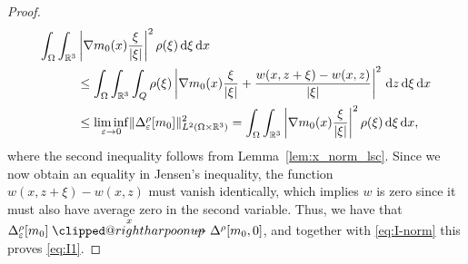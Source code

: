 \documentclass[reqno,11pt]{amsart}
\makeatletter
\numberwithin{equation}{section}
\theoremstyle{thmlemcorr}
\numberwithin{theorem}{section}
\theoremstyle{thmlemcorr*}
\theoremstyle{defi}
\theoremstyle{remexample}
\theoremstyle{ass}
\newcommand{\R}{\mathbb{R}}
\renewcommand{\epsilon}{\varepsilon}
\DeclarePairedDelimiter{\abs}{\lvert}{\rvert}
\DeclarePairedDelimiter{\norm}{\lVert}{\rVert}
\newcommand{\1}{\mathds{1}}
\DeclareRobustCommand{\wtwoscale}{%
  \clippedrightharpoonup\mathrel{\mspace{-15mu}}\rightharpoonup
}
\newcommand{\clippedrightharpoonup}{%
  \mathrel{\mathpalette\clipped@rightharpoonup\relax}%
}
\newcommand{\clipped@rightharpoonup}[2]{%
  \sbox\z@{$\m@th#1\mspace{6mu}$}%
  \clipbox{0pt 0pt {\dimexpr\width-.5\wd\z@} 0pt}{$\m@th#1\rightharpoonup$}%
  \smash{\clipbox{{\wd\z@} 0pt 0pt {-\width}}{$\m@th#1\rightharpoonup$}}%
}
\newcommand{\wxtwoscale}{\overset{x}{\wtwoscale}}
\newcommand{\Om}{\Omega}
\newcommand{\dl}{\,\mathrm{d}}
\makeatother
\begin{document}
\begin{proof}
    \begin{align*}
        \int_{\Om} \int_{\R^3} &\left| \nabla m_0(x)  \frac{\xi}{|\xi|}\right|^2 \rho(\xi) \dl \xi \dl x\\
        &\leq \int_{\Omega}\int_{\R^3}\int_{Q} \rho(\xi)\left|\nabla m_0(x) \frac{\xi}{|\xi|} + \frac{w(x,z+\xi)-w(x,z)}{\abs{\xi}}\right|^2\dl z \dl \xi \dl x \\
        &\leq \liminf_{\epsilon \to 0} \norm{\Delta^\rho_\epsilon [m_0]}^2_{L^2(\Omega \times \R^3)}=\int_{\Om} \int_{\R^3} \left| \nabla m_0(x)  \frac{\xi}{|\xi|}\right|^2 \rho(\xi) \dl \xi \dl x,
    \end{align*}
    where %
    the second inequality follows from Lemma~\ref{lem:x_norm_lsc}. %
    Since we now obtain an equality in Jensen's inequality, the function $w(x,z+\xi)-w(x,z)$ must vanish identically, which implies $w$ is zero since it must also have average zero in the second variable. Thus, we have that $\Delta^\rho_\epsilon[m_0] \wxtwoscale \Delta^\rho[m_0,0]$, and together with \eqref{eq:I-norm} this proves \eqref{eq:I1}.


\end{proof}
\end{document}
